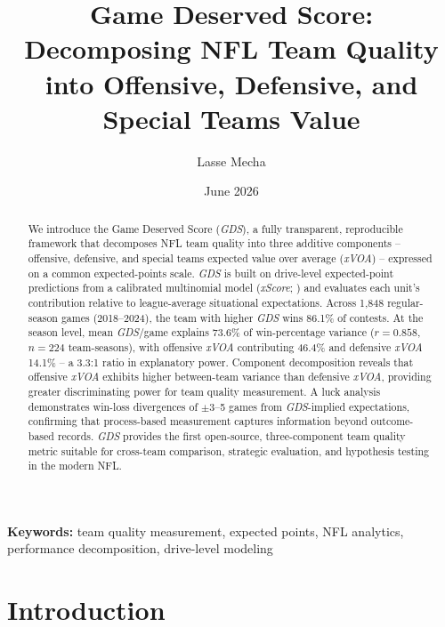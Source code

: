 \documentclass[12pt,a4paper]{article}
\title{Game Deserved Score: Decomposing NFL Team Quality\\into Offensive, Defensive, and Special Teams Value}
\author{Lasse Mecha}
\date{June 2026}
\newcommand{\xscore}{\textit{xScore}}
\newcommand{\xvoa}{\textit{xVOA}}
\newcommand{\gds}{\textit{GDS}}
\begin{document}
\maketitle

\begin{abstract}
We introduce the Game Deserved Score (\gds{}), a fully transparent, reproducible framework that decomposes NFL team quality into three additive components -- offensive, defensive, and special teams expected value over average (\xvoa{}) -- expressed on a common expected-points scale. \gds{} is built on drive-level expected-point predictions from a calibrated multinomial model (\xscore{}; \citealt{mecha2026xscore-model}) and evaluates each unit's contribution relative to league-average situational expectations. Across 1,848 regular-season games (2018--2024), the team with higher \gds{} wins 86.1\% of contests. At the season level, mean \gds{}/game explains 73.6\% of win-percentage variance ($r = 0.858$, $n = 224$ team-seasons), with offensive \xvoa{} contributing 46.4\% and defensive \xvoa{} 14.1\% -- a 3.3:1 ratio in explanatory power. Component decomposition reveals that offensive \xvoa{} exhibits higher between-team variance than defensive \xvoa{}, providing greater discriminating power for team quality measurement. A luck analysis demonstrates win-loss divergences of $\pm$3--5 games from \gds{}-implied expectations, confirming that process-based measurement captures information beyond outcome-based records. \gds{} provides the first open-source, three-component team quality metric suitable for cross-team comparison, strategic evaluation, and hypothesis testing in the modern NFL.
\end{abstract}

\textbf{Keywords:} team quality measurement, expected points, NFL analytics, performance decomposition, drive-level modeling

\section{Introduction}
\label{sec:introduction}
\end{document}

